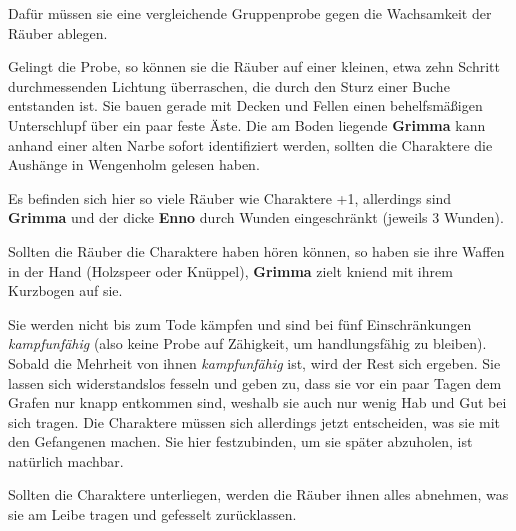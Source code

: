 {
Dafür müssen sie eine vergleichende Gruppenprobe %
gegen die Wachsamkeit  der Räuber %
ablegen.
}


Gelingt die Probe, so können sie die Räuber auf einer kleinen, etwa zehn Schritt durchmessenden Lichtung überraschen, die durch den Sturz einer Buche entstanden ist. Sie bauen gerade mit Decken und Fellen einen behelfsmäßigen Unterschlupf über ein paar feste Äste. Die am Boden liegende \textbf{Grimma} kann anhand einer alten Narbe sofort identifiziert werden, sollten die Charaktere die Aushänge in Wengenholm gelesen haben.

Es befinden sich hier so viele Räuber wie Charaktere +1, allerdings sind \textbf{Grimma} und der dicke \textbf{Enno} durch Wunden eingeschränkt (jeweils 3 Wunden).


Sollten die Räuber die Charaktere haben hören können, so haben sie ihre Waffen in der Hand (Holzspeer oder Knüppel), \textbf{Grimma} zielt kniend mit ihrem Kurzbogen auf sie.

\kreaturraeuber

Sie werden nicht bis zum Tode kämpfen und sind bei fünf Einschränkungen \textit{kampfunfähig} (also keine Probe auf Zähigkeit, um handlungsfähig zu bleiben). Sobald die Mehrheit von ihnen \textit{kampfunfähig} ist, wird der Rest sich ergeben. Sie lassen sich widerstandslos fesseln und geben zu, dass sie vor ein paar Tagen dem Grafen nur knapp entkommen sind, weshalb sie auch nur wenig Hab und Gut bei sich tragen.
Die Charaktere müssen sich allerdings jetzt entscheiden, was sie mit den Gefangenen machen. Sie hier festzubinden, um sie später abzuholen, ist natürlich machbar.

Sollten die Charaktere unterliegen, werden die Räuber ihnen alles abnehmen, was sie am Leibe tragen und gefesselt zurücklassen. 


